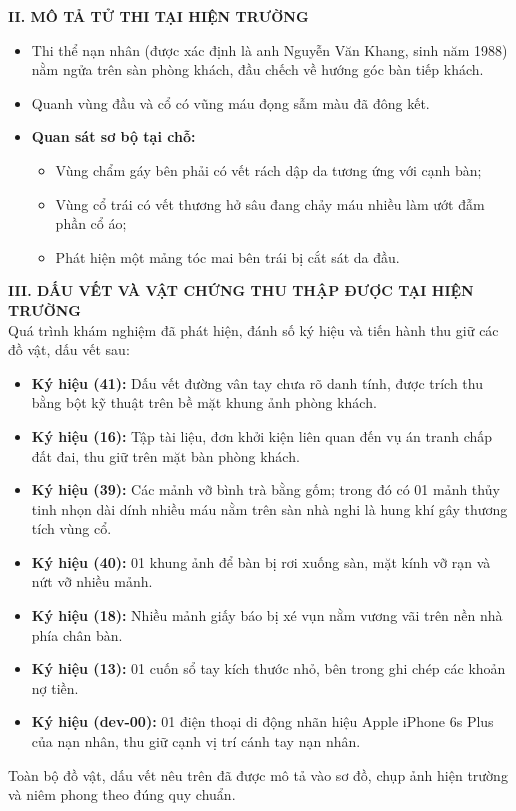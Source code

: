 \documentclass[12pt,a4paper]{article}
\begin{document}
\vspace{0.3cm}\noindent\textbf{\large II. MÔ TẢ TỬ THI TẠI HIỆN TRƯỜNG}\\[0.15cm]


\begin{itemize}[leftmargin=*, itemsep=2pt, topsep=2pt, parsep=0pt]
  \item Thi thể nạn nhân (được xác định là anh Nguyễn Văn Khang, sinh năm 1988) nằm ngửa trên sàn phòng khách, đầu chếch về hướng góc bàn tiếp khách.
  \item Quanh vùng đầu và cổ có vũng máu đọng sẫm màu đã đông kết.
  \item \textbf{Quan sát sơ bộ tại chỗ:}
\begin{itemize}[leftmargin=*, itemsep=2pt, topsep=2pt, parsep=0pt]
  \item Vùng chẩm gáy bên phải có vết rách dập da tương ứng với cạnh bàn;
  \item Vùng cổ trái có vết thương hở sâu đang chảy máu nhiều làm ướt đẫm phần cổ áo;
  \item Phát hiện một mảng tóc mai bên trái bị cắt sát da đầu.


\end{itemize}
\end{itemize}

\vspace{0.3cm}\noindent\textbf{\large III. DẤU VẾT VÀ VẬT CHỨNG THU THẬP ĐƯỢC TẠI HIỆN TRƯỜNG}\\[0.15cm]


Quá trình khám nghiệm đã phát hiện, đánh số ký hiệu và tiến hành thu giữ các đồ vật, dấu vết sau:


\begin{itemize}[leftmargin=*, itemsep=2pt, topsep=2pt, parsep=0pt]
  \item \textbf{Ký hiệu (41):} Dấu vết đường vân tay chưa rõ danh tính, được trích thu bằng bột kỹ thuật trên bề mặt khung ảnh phòng khách.
  \item \textbf{Ký hiệu (16):} Tập tài liệu, đơn khởi kiện liên quan đến vụ án tranh chấp đất đai, thu giữ trên mặt bàn phòng khách.
  \item \textbf{Ký hiệu (39):} Các mảnh vỡ bình trà bằng gốm; trong đó có 01 mảnh thủy tinh nhọn dài dính nhiều máu nằm trên sàn nhà nghi là hung khí gây thương tích vùng cổ.
  \item \textbf{Ký hiệu (40):} 01 khung ảnh để bàn bị rơi xuống sàn, mặt kính vỡ rạn và nứt vỡ nhiều mảnh.
  \item \textbf{Ký hiệu (18):} Nhiều mảnh giấy báo bị xé vụn nằm vương vãi trên nền nhà phía chân bàn.
  \item \textbf{Ký hiệu (13):} 01 cuốn sổ tay kích thước nhỏ, bên trong ghi chép các khoản nợ tiền.
  \item \textbf{Ký hiệu (dev-00):} 01 điện thoại di động nhãn hiệu Apple iPhone 6s Plus của nạn nhân, thu giữ cạnh vị trí cánh tay nạn nhân.

\end{itemize}
Toàn bộ đồ vật, dấu vết nêu trên đã được mô tả vào sơ đồ, chụp ảnh hiện trường và niêm phong theo đúng quy chuẩn.
\end{document}
